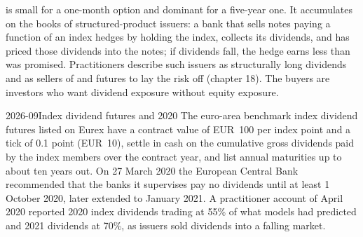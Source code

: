 is small for a one-month option and dominant for a five-year one. It
accumulates on the books of structured-product issuers: a bank that sells notes
paying a function of an index hedges by holding the index, collects its dividends, and
has priced those dividends into the notes; if dividends fall, the hedge earns less than
was promised. Practitioners describe such issuers as structurally long dividends and
as sellers of  and futures to lay the risk off (chapter 18). The buyers
are investors who want dividend exposure without equity exposure.

\begin{dated}{2026-09}{Index dividend futures and 2020}\label{dat:dv:dividends-borrow-and-forwards:divfut}
The euro-area benchmark index dividend futures listed on Eurex have a contract value
of EUR~100 per index point and a tick of 0.1 point (EUR~10), settle in cash on the
cumulative gross dividends paid by the index members over the contract year, and list
annual maturities up to about ten years out. On 27 March 2020 the European Central Bank
recommended that the banks it supervises pay no dividends until at least 1 October
2020, later extended to January 2021. A practitioner account of April 2020 reported
2020 index dividends trading at 55\% of what models had predicted and 2021 dividends
at 70\%, as issuers sold dividends into a falling market.
\end{dated}

\begin{omfigure}

\label{fig:dv:dividends-borrow-and-forwards:flows}
\end{omfigure}

